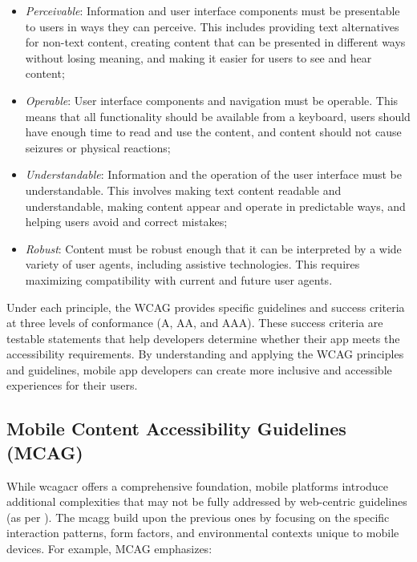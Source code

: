 \begin{itemize}
    \item \textit{Perceivable}: Information and user interface components must be presentable to users in ways they can perceive. This includes providing text alternatives for non-text content, creating content that can be presented in different ways without losing meaning, and making it easier for users to see and hear content;
    
    \item \textit{Operable}: User interface components and navigation must be operable. This means that all functionality should be available from a keyboard, users should have enough time to read and use the content, and content should not cause seizures or physical reactions;
    
    \item \textit{Understandable}: Information and the operation of the user interface must be understandable. This involves making text content readable and understandable, making content appear and operate in predictable ways, and helping users avoid and correct mistakes;
    
    \item \textit{Robust}: Content must be robust enough that it can be interpreted by a wide variety of user agents, including assistive technologies. This requires maximizing compatibility with current and future user agents.
\end{itemize}

Under each principle, the WCAG provides specific guidelines and success criteria at three levels of conformance (A, AA, and AAA). These success criteria are testable statements that help developers determine whether their app meets the accessibility requirements. By understanding and applying the WCAG principles and guidelines, mobile app developers can create more inclusive and accessible experiences for their users.

\subsection{Mobile Content Accessibility Guidelines (MCAG)}

While \acrshort{wcagacr} offers a comprehensive foundation, mobile platforms introduce additional complexities that may not be fully addressed by web-centric guidelines (as per \cite{site:mcag}). The \gls{mcagg} build upon the previous ones by focusing on the specific interaction patterns, form factors, and environmental contexts unique to mobile devices. For example, MCAG emphasizes:

